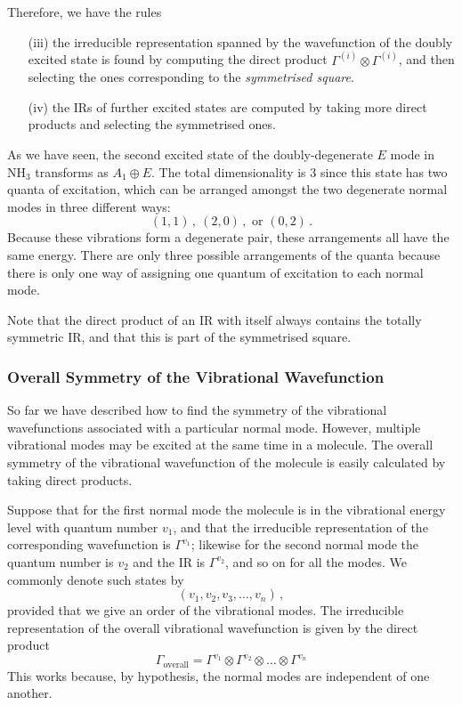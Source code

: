 \documentclass{article}
\theoremstyle{plain}\theoremheaderfont{\normalfont\itshape}\theorembodyfont{\rmfamily}\theoremseparator{.}\newtheorem*{rem}{Remark}\newtheorem*{ex}{Example}\newtheorem*{proof}{Proof}\newtheorem*{altp}{Alternative proof}
\theoremstyle{plain}\theoremheaderfont{\normalfont\bfseries}\theorembodyfont{\rmfamily}\theoremseparator{.}\newtheorem{thm}{Theorem}[section]\newtheorem{lem}[thm]{Lemma}\newtheorem{prop}[thm]{Proposition}\newtheorem*{cor}{Corollary}\newtheorem{defn}[thm]{Definition}\newtheorem{clm}[thm]{Claim}\newtheorem{clminproof}{Claim}\newtheorem{pos}{Postulate}[section]
\theoremstyle{break}\theoremheaderfont{\normalfont\itshape}\theorembodyfont{\rmfamily}\theoremseparator{.\medskip}\newtheorem*{proofskip}{Proof}\newtheorem*{exs}{Examples}\newtheorem*{rems}{Remarks}
\theoremstyle{break}\theoremheaderfont{\normalfont\bfseries}\theorembodyfont{\rmfamily}\theoremseparator{.\medskip}\newtheorem{lemskip}[thm]{Lemma}\newtheorem{defnskip}[thm]{Definition}\newtheorem{propskip}[thm]{Proposition}\newtheorem{thmskip}[thm]{Theorem}
\numberwithin{equation}{section}
\begin{document}
    Therefore, we have the rules
    \begin{enumerate}[topsep=0pt]
        \item[(iii)] the irreducible representation spanned by the wavefunction of the doubly excited state is found by computing the direct product \(\Gamma^{(i)}\otimes\Gamma^{(i)}\), and then selecting the ones corresponding to the \textit{symmetrised square}.
        \item[(iv)] the IRs of further excited states are computed by taking more direct products and selecting the symmetrised ones.
    \end{enumerate}

    As we have seen, the second excited state of the doubly-degenerate \(E\) mode in \(\mathrm{NH_3}\) transforms as \(A_1\oplus E\). The total dimensionality is 3 since this state has two quanta of excitation, which can be arranged amongst the two degenerate normal modes in three different ways:
    \begin{equation}
        (1,1)\,,\ (2,0)\,,\text{ or } (0,2)\,.
    \end{equation}
    Because these vibrations form a degenerate pair, these arrangements all have the same energy. There are only three possible arrangements of the quanta because there is only one way of assigning one quantum of excitation to each normal mode.

    Note that the direct product of an IR with itself always contains the totally symmetric IR, and that this is part of the symmetrised square.
    \subsubsection{Overall Symmetry of the Vibrational Wavefunction}
    So far we have described how to find the symmetry of the vibrational wavefunctions associated with a particular normal mode. However, multiple vibrational modes may be excited at the same time in a molecule. The overall symmetry of the vibrational wavefunction of the molecule is easily calculated by taking direct products.

    Suppose that for the first normal mode the molecule is in the vibrational energy level with quantum number \(v_1\), and that the irreducible representation of the corresponding wavefunction is \(\Gamma^{v_1}\); likewise for the second normal mode the quantum number is \(v_2\) and the IR is \(\Gamma^{v_2}\), and so on for all the modes. We commonly denote such states by
    \begin{equation}
        (v_1,v_2,v_3,\dots,v_n)\,,
    \end{equation}
    provided that we give an order of the vibrational modes. The irreducible representation of the overall vibrational wavefunction is given by the direct product
    \begin{equation}
        \Gamma_{\text{overall}}=\Gamma^{v_1}\otimes\Gamma^{v_2}\otimes\dots\otimes\Gamma^{v_n}
    \end{equation}
    This works because, by hypothesis, the normal modes are independent of one another.
\end{document}
